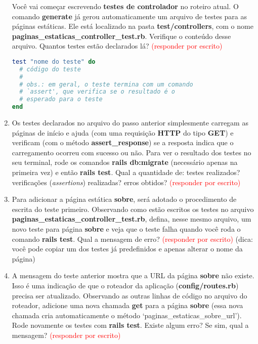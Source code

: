 \documentclass[a4paper,12pt]{article}
\begin{document}
\begin{enumerate}
  Você vai começar escrevendo \textbf{testes de controlador} no roteiro atual. O comando \textbf{generate} já gerou automaticamente um arquivo de testes para as páginas estáticas. Ele está localizado na pasta \textbf{test/controllers}, com o nome \textbf{paginas\_estaticas\_controller\_test.rb}. Verifique o conteúdo desse arquivo. Quantos testes estão declarados lá? \textcolor{red}{(responder por escrito)}

  \begin{lstlisting}[language=Ruby, title=Formato genérico para declaração de um teste]
test "nome do teste" do
  # código do teste
  #
  # obs.: em geral, o teste termina com um comando
  # `assert', que verifica se o resultado é o
  # esperado para o teste
end
  \end{lstlisting}

  \item Os testes declarados no arquivo do passo anterior simplesmente carregam as páginas de início e ajuda (com uma requisição \textbf{HTTP} do tipo \textbf{GET}) e verificam (com o método \textbf{assert\_response}) se a resposta indica que o carregamento ocorreu com sucesso ou não. Para ver o resultado dos testes no seu terminal, rode os comandos \textbf{rails db:migrate} (necessário apenas na primeira vez) e então \textbf{rails test}. Qual a quantidade de: testes realizados? verificações (\textit{assertions}) realizadas? erros obtidos? \textcolor{red}{(responder por escrito)}
  \item Para adicionar a página estática \textbf{sobre}, será adotado o procedimento de escrita do teste primeiro. Observando como estão escritos os testes no arquivo \textbf{paginas\_estaticas\_controller\_test.rb}, defina, nesse mesmo arquivo, um novo teste para página \textbf{sobre} e veja que o teste falha quando você roda o comando \textbf{rails test}. Qual a mensagem de erro? \textcolor{red}{(responder por escrito)} (dica: você pode copiar um dos testes já predefinidos e apenas alterar o nome da página)
  \item A mensagem do teste anterior mostra que a URL da página \textbf{sobre} não existe. Isso é uma indicação de que o roteador da aplicação (\textbf{config/routes.rb}) precisa ser atualizado. Observando as outras linhas de código no arquivo do roteador, adicione uma nova chamada \textbf{get} para a página \textbf{sobre} (essa nova chamada cria automaticamente o método `paginas\_estaticas\_sobre\_url'). Rode novamente os testes com \textbf{rails test}. Existe algum erro? Se sim, qual a mensagem? \textcolor{red}{(responder por escrito)}


\end{enumerate}
\end{document}
